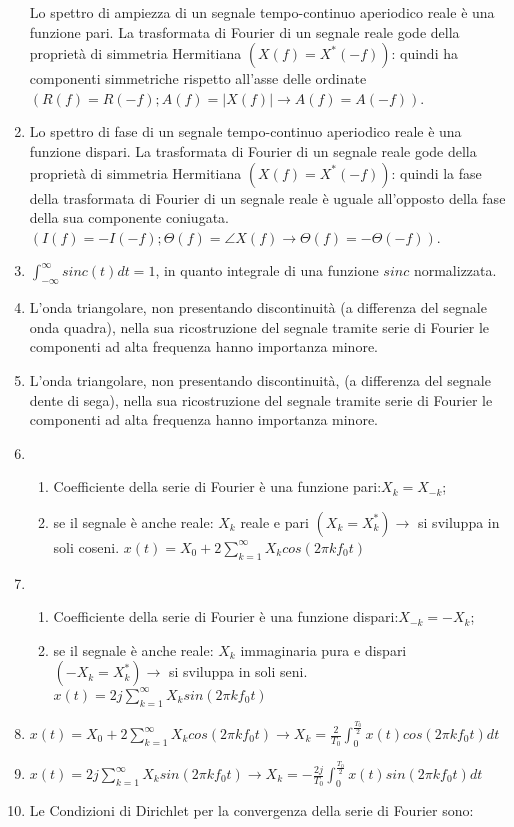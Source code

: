 \documentclass[
  paper=a4,
  ,captions=tableheading
]{scrartcl}
\providecommand{\tightlist}{%
  \setlength{\itemsep}{0pt}\setlength{\parskip}{0pt}}
\begin{document}
\begin{enumerate}
  Lo spettro di ampiezza di un segnale tempo-continuo aperiodico reale è
  una funzione pari. La trasformata di Fourier di un segnale reale gode
  della proprietà di simmetria Hermitiana \((X(f) = X^*(-f))\): quindi
  ha componenti simmetriche rispetto all'asse delle ordinate
  \((R(f)=R(-f); A(f)=|X(f)| \to A(f)=A(-f))\).
\item
  Lo spettro di fase di un segnale tempo-continuo aperiodico reale è una
  funzione dispari. La trasformata di Fourier di un segnale reale gode
  della proprietà di simmetria Hermitiana \((X(f) = X^*(-f))\): quindi
  la fase della trasformata di Fourier di un segnale reale è uguale
  all'opposto della fase della sua componente coniugata.
  \((I(f)=-I(-f); \Theta(f)=\angle X(f) \to \Theta(f)=-\Theta(-f))\).
\item
  \(\displaystyle \int_{-\infty}^\infty sinc(t)dt = 1\), in quanto
  integrale di una funzione \(sinc\) normalizzata.
\item
  L'onda triangolare, non presentando discontinuità (a differenza del
  segnale onda quadra), nella sua ricostruzione del segnale tramite
  serie di Fourier le componenti ad alta frequenza hanno importanza
  minore.
\item
  L'onda triangolare, non presentando discontinuità, (a differenza del
  segnale dente di sega), nella sua ricostruzione del segnale tramite
  serie di Fourier le componenti ad alta frequenza hanno importanza
  minore.
\item
  \begin{enumerate}
  \def\labelenumii{\arabic{enumii}.}
  \tightlist
  \item
    Coefficiente della serie di Fourier è una funzione
    pari:\(X_k = X_{-k}\);
  \item
    se il segnale è anche reale: \(X_k\) reale e pari
    \((X_k = X^*_k) \to\) si sviluppa in soli coseni.
    \(\displaystyle x(t)= X_0 + 2 \sum_{k=1}^{\infty} X_k cos (2\pi k f_0 t)\)
  \end{enumerate}
\item
  \begin{enumerate}
  \def\labelenumii{\arabic{enumii}.}
  \tightlist
  \item
    Coefficiente della serie di Fourier è una funzione
    dispari:\(X_{-k} = -X_{k}\);
  \item
    se il segnale è anche reale: \(X_k\) immaginaria pura e dispari
    \((-X_k = X^*_k) \to\) si sviluppa in soli seni.
    \(\displaystyle x(t)= 2j \sum_{k=1}^{\infty} X_k sin (2\pi k f_0 t)\)
  \end{enumerate}
\item
  \(\displaystyle x(t)=X_0 + 2\sum_{k=1}^{\infty} X_k cos (2\pi k f_0 t) \to X_k = \frac{2}{T_0} \int_{0}^{\frac{T_0}{2}} x(t) cos (2\pi k f_0 t) dt\)
\item
  \(\displaystyle x(t)= 2j \sum_{k=1}^{\infty} X_k sin (2\pi k f_0 t) \to X_k = -\frac{2j}{T_0} \int_{0}^{\frac{T_0}{2}} x(t) sin (2\pi k f_0 t)dt\)
\item
  Le Condizioni di Dirichlet per la convergenza della serie di Fourier
  sono:


\end{enumerate}
\end{document}
